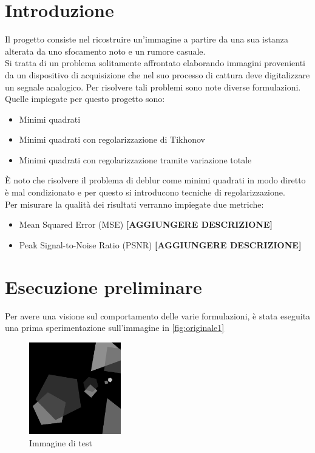 \documentclass[11pt]{article}
\begin{document}
\section{Introduzione}
Il progetto consiste nel ricostruire un'immagine a partire da una sua istanza alterata da uno sfocamento noto e un rumore casuale.\\
Si tratta di un problema solitamente affrontato elaborando immagini provenienti da un dispositivo di acquisizione che nel suo processo di cattura deve digitalizzare un segnale analogico. 
Per risolvere tali problemi sono note diverse formulazioni. Quelle impiegate per questo progetto sono:
\begin{itemize}
    \setlength\itemsep{0.05cm}
    \item Minimi quadrati
    \item Minimi quadrati con regolarizzazione di Tikhonov
    \item Minimi quadrati con regolarizzazione tramite variazione totale
\end{itemize}
È noto che risolvere il problema di deblur come minimi quadrati in modo diretto è mal condizionato e per questo si introducono tecniche di regolarizzazione.\\
Per misurare la qualità dei risultati verranno impiegate due metriche:
\begin{itemize}
    \setlength\itemsep{0.05cm}
    \item Mean Squared Error (MSE) \textbf{[AGGIUNGERE DESCRIZIONE]}
    \item Peak Signal-to-Noise Ratio (PSNR) \textbf{[AGGIUNGERE DESCRIZIONE]}
\end{itemize}

\section{Esecuzione preliminare}
Per avere una visione sul comportamento delle varie formulazioni, è stata eseguita una prima sperimentazione sull'immagine in \autoref{fig:originale1}
\begin{figure}[H]
    \centering
    \includegraphics[width=4cm]{esecuzione/originale.png}
    \caption{Immagine di test}
    \label{fig:originale1}
\end{figure}
\end{document}
